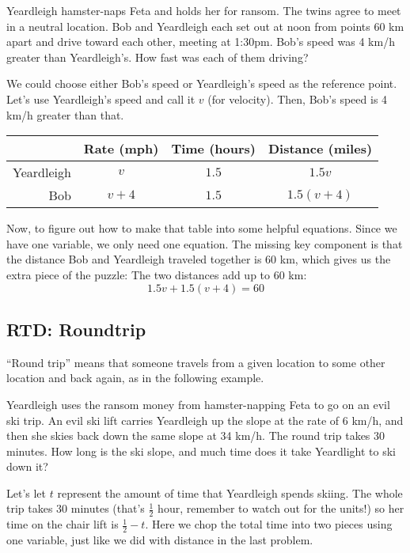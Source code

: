 \begin{boxex}
Yeardleigh hamster-naps Feta and holds her for ransom. The twins agree to meet in a neutral location. Bob and Yeardleigh each set out at noon from points 60 km apart and drive toward each other, meeting at 1:30pm. Bob's speed was 4 km/h greater than Yeardleigh's. How fast was each of them driving?
\end{boxex}

We could choose either Bob's speed or Yeardleigh's speed as the reference point. Let's use Yeardleigh's speed and call it $v$ (for velocity). Then, Bob's speed is 4 km/h greater than that.

\begin{center}
\begin{tabular}{r|ccc}
				& Rate (mph)			& Time (hours)		& Distance (miles)\\\hline
Yeardleigh		& $v$					& $1.5$				& $1.5v$\\
Bob				& $v+4$				& $1.5$				& $1.5(v+4)$\\
\end{tabular}
\end{center}

Now, to figure out how to make that table into some helpful equations. Since we have one variable, we only need one equation. The missing key component is that the distance Bob and Yeardleigh traveled together is 60 km, which gives us the extra piece of the puzzle: The two distances add up to 60 km:
\[
1.5v + 1.5(v+4) = 60
\]

\subsection*{RTD: Roundtrip}
``Round trip'' means that someone travels from a given location to some other location and back again, as in the following example.

\begin{boxex}
Yeardleigh uses the ransom money from hamster-napping Feta to go on an evil ski trip. An evil ski lift carries Yeardleigh up the slope at the rate of 6 km/h, and then she skies back down the same slope at 34 km/h. The round trip takes 30 minutes. How long is the ski slope, and much time does it take Yeardlight to ski down it?
\end{boxex}

Let's let $t$ represent the amount of time that Yeardleigh spends skiing. The whole trip takes 30 minutes (that's $\frac{1}{2}$ hour, remember to watch out for the units!) so her time on the chair lift is $\frac{1}{2} - t$. Here we chop the total time into two pieces using one variable, just like we did with distance in the last problem.

